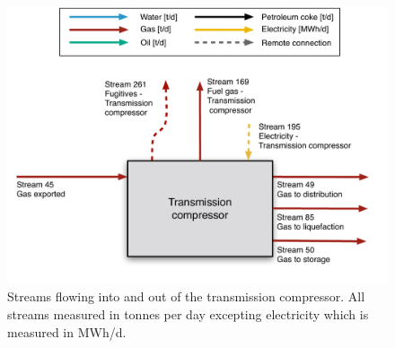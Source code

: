 \documentclass[11pt]{report}
\begin{document}
\begin{figure}
\includegraphics[width=0.85\columnwidth]{images/Transmission_compressor_PF.pdf}
\caption{Streams flowing into and out of the transmission compressor. All streams measured in tonnes per day excepting electricity which is measured in MWh/d.}
\label{fig:Transmission_compressor_PF}
\end{figure}
\end{document}
